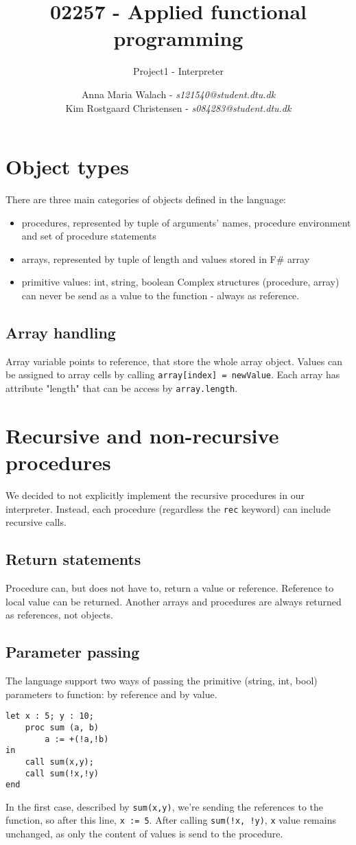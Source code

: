 \documentclass[10pt]{scrartcl}
\title{02257 - Applied functional programming}
\subtitle{Project1 - Interpreter}
\author{Anna Maria Walach - \textit {s121540@student.dtu.dk} \\ Kim Rostgaard Christensen - \textit {s084283@student.dtu.dk}}
\begin{document}
\maketitle
\section{Object types}
There are three main categories of objects defined in the language:
\begin{itemize}
\item procedures, represented by tuple of arguments' names, procedure environment and set of procedure statements
\item arrays, represented by tuple of length and values stored in F\# array
\item primitive values: int, string, boolean
Complex structures (procedure, array) can never be send as a value to the function - always as reference. 
\end{itemize}
\subsection{Array handling}
Array variable points to reference, that store the whole array object. Values can be assigned to array cells by calling \texttt{array[index] = newValue}. Each array has attribute "length" that can be access by \texttt{array.length}.
\section{Recursive and non-recursive procedures}
We decided to not explicitly implement the recursive procedures in our interpreter. Instead, each procedure (regardless the \texttt{rec} keyword) can include recursive calls.
\subsection{Return statements}
Procedure can, but does not have to, return a value or reference. Reference to local value can be returned. Another arrays and procedures are always returned as references, not objects. 
\subsection{Parameter passing}
The language support two ways of passing the primitive (string, int, bool) parameters to function: by reference and by value. 
\begin{lstlisting}
let x : 5; y : 10;
	proc sum (a, b)
		a := +(!a,!b)
in
	call sum(x,y);
	call sum(!x,!y)
end
\end{lstlisting}
In the first case, described by \texttt{sum(x,y)}, we're sending the references to the function, so after this line, \texttt{x := 5}. After calling \texttt{sum(!x, !y)}, \texttt{x} value remains unchanged, as only the content of values is send to the procedure.
\end{document}
